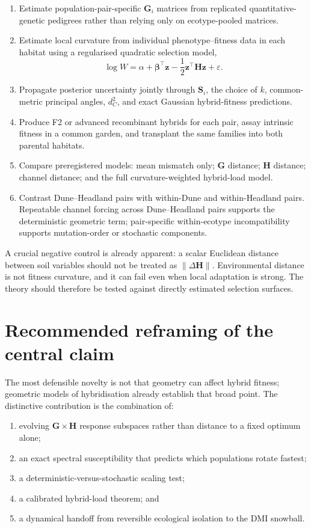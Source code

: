 \documentclass[11pt,a4paper]{article}
\newcommand{\G}{\mathbf G}
\newcommand{\Hh}{\mathbf H}
\newcommand{\Sop}{\mathbf S}
\begin{document}
\begin{enumerate}[leftmargin=1.6em]
\item Estimate population-pair-specific \(\G_i\) matrices from replicated quantitative-genetic pedigrees rather than relying only on ecotype-pooled matrices.
\item Estimate local curvature from individual phenotype--fitness data in each habitat using a regularised quadratic selection model,
\begin{equation}
\log W=\alpha+\bm\beta^\top\mathbf z-\frac12\mathbf z^\top\Hh\mathbf z+\varepsilon.
\end{equation}
\item Propagate posterior uncertainty jointly through \(\Sop_i\), the choice of \(k\), common-metric principal angles, \(d_C^2\), and exact Gaussian hybrid-fitness predictions.
\item Produce F2 or advanced recombinant hybrids for each pair, assay intrinsic fitness in a common garden, and transplant the same families into both parental habitats.
\item Compare preregistered models: mean mismatch only; \(\G\) distance; \(\Hh\) distance; channel distance; and the full curvature-weighted hybrid-load model.
\item Contrast Dune--Headland pairs with within-Dune and within-Headland pairs. Repeatable channel forcing across Dune--Headland pairs supports the deterministic geometric term; pair-specific within-ecotype incompatibility supports mutation-order or stochastic components.
\end{enumerate}

A crucial negative control is already apparent: a scalar Euclidean distance between soil variables should not be treated as \(\lVert\Delta\Hh\rVert\). Environmental distance is not fitness curvature, and it can fail even when local adaptation is strong. The theory should therefore be tested against directly estimated selection surfaces.

\section{Recommended reframing of the central claim}

The most defensible novelty is not that geometry can affect hybrid fitness; geometric models of hybridisation already establish that broad point. The distinctive contribution is the combination of:
\begin{enumerate}[leftmargin=1.6em]
\item evolving \(\G\times\Hh\) response subspaces rather than distance to a fixed optimum alone;
\item an exact spectral susceptibility that predicts which populations rotate fastest;
\item a deterministic-versus-stochastic scaling test;
\item a calibrated hybrid-load theorem; and
\item a dynamical handoff from reversible ecological isolation to the DMI snowball.
\end{enumerate}
\end{document}
